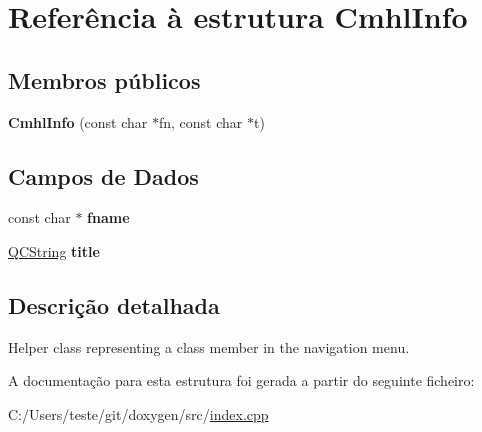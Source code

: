 \hypertarget{struct_cmhl_info}{\section{Referência à estrutura Cmhl\-Info}
\label{struct_cmhl_info}
}
\subsection*{Membros públicos}
\begin{DoxyCompactItemize}
\item 
\hypertarget{struct_cmhl_info_a54b5f2ff8c04ea814fe185b828049db3}{{\bfseries Cmhl\-Info} (const char $\ast$fn, const char $\ast$t)}\label{struct_cmhl_info_a54b5f2ff8c04ea814fe185b828049db3}

\end{DoxyCompactItemize}
\subsection*{Campos de Dados}
\begin{DoxyCompactItemize}
\item 
\hypertarget{struct_cmhl_info_a6a2fc0c236288b07ce5bd1335ca89fa2}{const char $\ast$ {\bfseries fname}}\label{struct_cmhl_info_a6a2fc0c236288b07ce5bd1335ca89fa2}

\item 
\hypertarget{struct_cmhl_info_a42bb80709d086df855babb087e63794b}{\hyperlink{class_q_c_string}{Q\-C\-String} {\bfseries title}}\label{struct_cmhl_info_a42bb80709d086df855babb087e63794b}

\end{DoxyCompactItemize}


\subsection{Descrição detalhada}
Helper class representing a class member in the navigation menu. 

A documentação para esta estrutura foi gerada a partir do seguinte ficheiro\-:\begin{DoxyCompactItemize}
\item 
C\-:/\-Users/teste/git/doxygen/src/\hyperlink{index_8cpp}{index.\-cpp}\end{DoxyCompactItemize}

